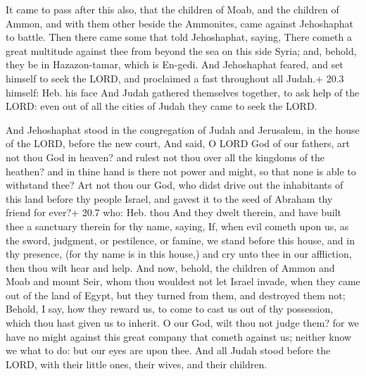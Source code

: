  It came to pass after this also, that the children of Moab,
and the children of Ammon, and with them other beside the Ammonites,
came against Jehoshaphat to battle.  Then there came some
that told Jehoshaphat, saying, There cometh a great multitude against
thee from beyond the sea on this side Syria; and, behold, they be in
Hazazon-tamar, which is En-gedi.  And Jehoshaphat feared,
and set himself to seek the LORD, and proclaimed a fast throughout all
Judah.+ 20.3 himself: Heb. his face  And Judah gathered
themselves together, to ask help of the LORD: even out of all the cities
of Judah they came to seek the LORD.

 And Jehoshaphat stood in the congregation of Judah and
Jerusalem, in the house of the LORD, before the new court, 
And said, O LORD God of our fathers, art not thou God in heaven? and
rulest not thou over all the kingdoms of the heathen? and in thine hand
is there not power and might, so that none is able to withstand thee?
 Art not thou our God, who didst drive out the inhabitants
of this land before thy people Israel, and gavest it to the seed of
Abraham thy friend for ever?+ 20.7 who: Heb. thou  And they
dwelt therein, and have built thee a sanctuary therein for thy name,
saying,  If, when evil cometh upon us, as the sword,
judgment, or pestilence, or famine, we stand before this house, and in
thy presence, (for thy name is in this house,) and cry unto thee in our
affliction, then thou wilt hear and help.  And now, behold,
the children of Ammon and Moab and mount Seir, whom thou wouldest not
let Israel invade, when they came out of the land of Egypt, but they
turned from them, and destroyed them not;  Behold, I say,
how they reward us, to come to cast us out of thy possession, which thou
hast given us to inherit.  O our God, wilt thou not judge
them? for we have no might against this great company that cometh
against us; neither know we what to do: but our eyes are upon thee.
 And all Judah stood before the LORD, with their little
ones, their wives, and their children.

